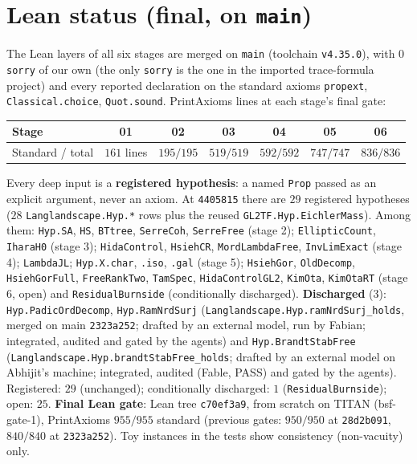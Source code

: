 \documentclass[11pt,a4paper]{article}
\begin{document}
\section*{Lean status (final, on \texttt{main})}

The Lean layers of all six stages are merged on \texttt{main} (toolchain \texttt{v4.35.0}), with $0$ \texttt{sorry} of our own (the
only \texttt{sorry} is the one in the imported trace-formula project) and every reported declaration on the standard
axioms \texttt{propext}, \texttt{Classical.choice}, \texttt{Quot.sound}. PrintAxioms lines at each stage's final gate:

\begin{center}
\small
\begin{tabular}{lcccccc}
\toprule
\textbf{Stage} & \textbf{01} & \textbf{02} & \textbf{03} & \textbf{04} & \textbf{05} & \textbf{06}\\
\midrule
Standard / total & $161$ lines & $195/195$ & $519/519$ & $592/592$ & $747/747$ & $836/836$\\
\bottomrule
\end{tabular}
\end{center}

\begin{sloppypar}
Every deep input is a \textbf{registered hypothesis}: a named \texttt{Prop} passed as an explicit argument, never an
axiom. At \texttt{4405815} there are $29$ registered hypotheses ($28$ \texttt{Langlandscape.Hyp.*} rows plus the reused
\texttt{GL2TF.Hyp.EichlerMass}). Among them: \texttt{Hyp.SA}, \texttt{HS}, \texttt{BTtree}, \texttt{SerreCoh},
\texttt{SerreFree} (stage 2); \texttt{EllipticCount}, \texttt{IharaH0}
(stage 3); \texttt{HidaControl}, \texttt{HsiehCR}, \texttt{MordLambdaFree}, \texttt{InvLimExact}
(stage 4); \texttt{LambdaJL}; \texttt{Hyp.X.char}, \texttt{.iso}, \texttt{.gal} (stage 5); \texttt{HsiehGor}, \texttt{OldDecomp},
\texttt{HsiehGorFull}, \texttt{FreeRankTwo}, \texttt{TamSpec}, \texttt{HidaControlGL2}, \texttt{KimOta},
\texttt{KimOtaRT} (stage 6, open) and \texttt{ResidualBurnside} (conditionally discharged).
\textbf{Discharged} (3): \texttt{Hyp.PadicOrdDecomp}, \texttt{Hyp.RamNrdSurj} (\texttt{Langlandscape.Hyp.ramNrdSurj\_holds}, merged on main \texttt{2323a252}; drafted by an external model, run by Fabian; integrated, audited and gated by the agents) and \texttt{Hyp.BrandtStabFree} (\texttt{Langlandscape.Hyp.brandtStabFree\_holds}; drafted by an external model on Abhijit's machine; integrated, audited (Fable, PASS) and gated by the agents). Registered: $29$ (unchanged); conditionally discharged: $1$ (\texttt{ResidualBurnside}); open: $25$. \textbf{Final Lean gate}: Lean tree \texttt{c70ef3a9}, from scratch on TITAN (bsf-gate-1), PrintAxioms $955/955$ standard (previous gates: $950/950$ at \texttt{28d2b091}, $840/840$ at \texttt{2323a252}). Toy instances in the tests show consistency (non-vacuity) only.
\end{sloppypar}
\end{document}
